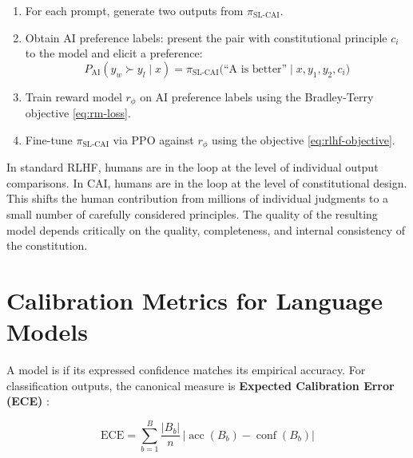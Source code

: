 \begin{enumerate}
    \item For each prompt, generate two outputs from $\pi_{\text{SL-CAI}}$.
    \item Obtain AI preference labels: present the pair with constitutional principle $c_i$ to the model and elicit a preference:
    \begin{equation}
    P_{\text{AI}}(y_w \succ y_l \mid x)
      = \pi_{\text{SL-CAI}}\!\bigl(\text{``A is better''} \mid x, y_1, y_2, c_i\bigr)
    \label{eq:rlaif}
    \end{equation}
    \item Train reward model $r_\phi$ on AI preference labels using the Bradley-Terry objective \eqref{eq:rm-loss}.
    \item Fine-tune $\pi_{\text{SL-CAI}}$ via PPO against $r_\phi$ using the objective \eqref{eq:rlhf-objective}.
\end{enumerate}

\begin{keyconcept}
In standard RLHF, humans are in the loop at the level of individual output comparisons. In CAI, humans are in the loop at the level of constitutional design. This shifts the human contribution from millions of individual judgments to a small number of carefully considered principles. The quality of the resulting model depends critically on the quality, completeness, and internal consistency of the constitution.
\end{keyconcept}

\section{Calibration Metrics for Language Models}
\label{sec:app10-calibration}

A model is  if its expressed confidence matches its empirical accuracy. For classification outputs, the canonical measure is \textbf{Expected Calibration Error (ECE)} \autocite{guo2017calibration}:

\begin{equation}
\text{ECE} = \sum_{b=1}^{B} \frac{|B_b|}{n}\,\left|\operatorname{acc}(B_b) - \operatorname{conf}(B_b)\right|
\label{eq:ece}
\end{equation}


